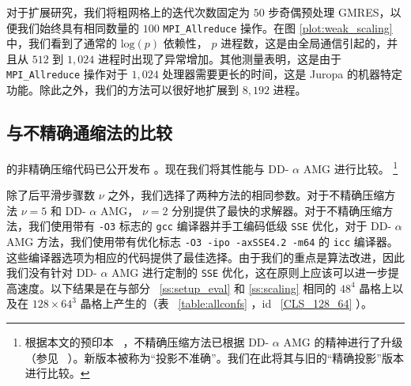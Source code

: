 \documentclass{siamltex}
\begin{document}
对于扩展研究，我们将粗网格上的迭代次数固定为    $50$    步奇偶预处理 GMRES，以便我们始终具有相同数量的    $100$       \texttt{MPI\_Allreduce}    操作。在图    \ref{plot:weak_scaling}    中，我们看到了通常的    $\mathrm{log}(p)$    依赖性，   $p$    进程数，这是由全局通信引起的，并且从    $512$    到    $1,\!024$    进程时出现了异常增加。其他测量表明，这是由于    \texttt{MPI\_Allreduce}    操作对于    $1,\!024$    处理器需要更长的时间，这是 Juropa 的机器特定功能。除此之外，我们的方法可以很好地扩展到    $8,\!192$    进程。
\subsection{与不精确通缩法的比较  }       \label{ss:leuscher_comp}

\cite{Luescher2007}    的非精确压缩代码已公开发布    \cite{wwwDDHMC}    。现在我们将其性能与 DD-    $\alpha$    AMG 进行比较。   \footnote{根据本文的预印本~   \cite{Frommer:2013fsa}   ，不精确压缩方法已根据 DD-   $\alpha$    AMG 的精神进行了升级（参见~   \cite{wwwOPENQCD}   ）。新版本被称为“投影不准确”。我们在此将其与旧的“精确投影”版本进行比较。  }

除了后平滑步骤数    $\nu$    之外，我们选择了两种方法的相同参数。对于不精确压缩方法    $\nu = 5$    和 DD-    $\alpha$    AMG，   $\nu=2$    分别提供了最快的求解器。对于不精确压缩方法，我们使用带有    \texttt{-O3}    标志的    \texttt{gcc}    编译器并手工编码低级    \texttt{SSE}    优化，对于 DD-    $\alpha$    AMG 方法，我们使用带有优化标志    \texttt{-O3 -ipo -axSSE4.2 -m64}    的    \texttt{icc}    编译器。这些编译器选项为相应的代码提供了最佳选择。由于我们的重点是算法改进，因此我们没有针对 DD-    $\alpha$    AMG 进行定制的    \texttt{SSE}    优化，这在原则上应该可以进一步提高速度。以下结果是在与部分~    \ref{ss:setup_eval}    和    \ref{ss:scaling}    相同的    $48^4$    晶格上以及在    $128 \times 64^3$    晶格上产生的（表~    \ref{table:allconfs}    ，id~    \ref{CLS_128_64}    ）。
\end{document}
